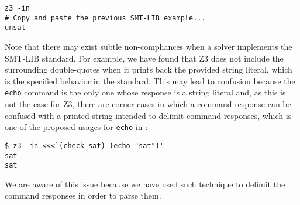 \begin{verbatim}
z3 -in 
# Copy and paste the previous SMT-LIB example...
unsat
\end{verbatim}

Note that there may exist subtle non-compliances when a solver implements the
SMT-LIB standard. For example, we have found that Z3 does not include the
surrounding double-quotes when it prints back the provided string literal, which
is the specified behavior in the standard. This may lead to confusion because
the \verb|echo| command is the only one whose response is a string literal and,
as this is not the case for Z3, there are corner cases in which a command
response can be confused with a printed string intended to delimit command
responses, which is one of the proposed usages for \verb|echo| in
\cite{smtLibStandard}:

\begin{verbatim}
$ z3 -in <<<`(check-sat) (echo "sat")'
sat
sat
\end{verbatim}

We are aware of this issue because we have used such technique to delimit the
command responses in order to parse them.
